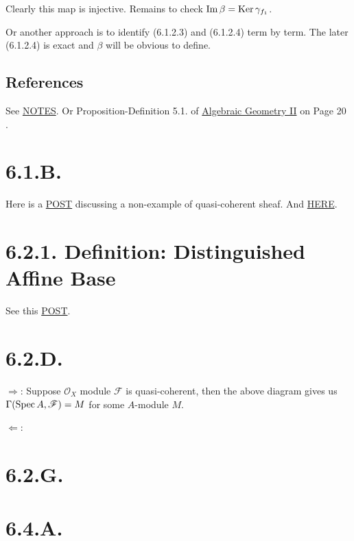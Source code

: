 Clearly this map is injective. Remains to check $\operatorname{Im} \beta=\operatorname{Ker} \gamma_{f_1}$.

Or another approach is to identify (6.1.2.3) and (6.1.2.4) term by term. The later (6.1.2.4) is exact and $\beta$ will be obvious to define. 

\subsection{References}

See \href{https://www.math.brown.edu/dabramov/MA/s1718/MA205-OModules.pdf}{NOTES}. Or Proposition-Definition 5.1. of \href{https://www.dam.brown.edu/people/mumford/alg_geom/papers/AGII.pdf}{Algebraic Geometry II} on Page 20 \cite{}.


\section{6.1.B.}

Here is a \href{https://math.stackexchange.com/questions/467197/examples-of-mathcalo-x-modules-that-are-not-quasi-coherent-sheaves}{POST} discussing a non-example of quasi-coherent sheaf. And \href{https://math.stackexchange.com/questions/976034/what-are-some-good-examples-of-non-quasicoherent-sheaves-not-satisfying-the-co}{HERE}.

\section{6.2.1. Definition: Distinguished Affine Base}

See this \href{https://math.stackexchange.com/questions/4304402/why-is-vakils-definition-of-distinguished-affine-base-of-a-scheme-not-a-base}{POST}.

\section{6.2.D.}

$\Rightarrow$: Suppose $\mathscr O_X$ module $\mathscr F$ is quasi-coherent, then the above diagram gives us $\Gamma(\operatorname{Spec} A,\mathscr F)=M$ for some $A$-module $M$. 

$\Leftarrow$: 

\section{6.2.G.}

\section{6.4.A.}

